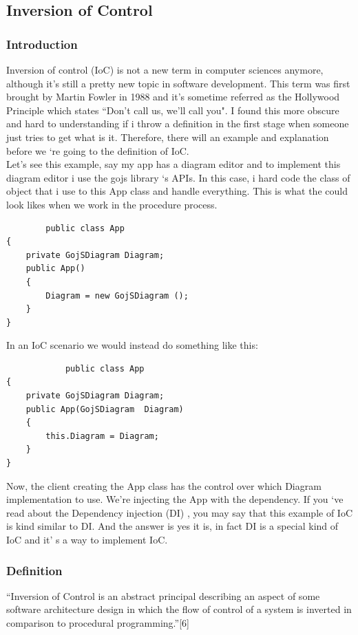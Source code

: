 \documentclass[14pt,a4paper]{extreport}
\begin{document}
		\subsection{Inversion of Control}
			\subsubsection{Introduction}
			Inversion of control (IoC) is not a new term in computer sciences anymore, although it’s still a pretty new topic in software development. This term was first brought by Martin Fowler in 1988\cite{wikiIC} and it’s sometime referred as the Hollywood Principle \cite{wikiIC} which states “Don't call us, we'll call you". I found this more obscure and hard to understanding if i throw a definition in the first stage when someone just tries to get what is it. Therefore, there will an example and explanation before we ‘re going to the definition of IoC.
\\			

Let’s see this example, say my app has a diagram editor and to implement this diagram editor i use the gojs library ‘s APIs. In this case, i hard code the class of object that i use to this App class and handle everything. This is what the could look likes when we work in the procedure process.

		\begin{verbatim}
		public class App
{
    private GojSDiagram Diagram;
    public App()
    {
        Diagram = new GojSDiagram ();
    }
}
		\end{verbatim}
		In an IoC scenario we would instead do something like this:
		\begin{verbatim}
			public class App
{
    private GojSDiagram Diagram;
    public App(GojSDiagram  Diagram)
    {
        this.Diagram = Diagram;
    }
}
		\end{verbatim}
		Now, the client creating the App class has the control over which Diagram implementation to use. We're injecting the App with the dependency. If you ‘ve read about the Dependency injection (DI) , you may say that this example of IoC is kind similar to DI. And the answer is yes it is, in fact DI is a special kind of IoC and it’ s a way to implement IoC.
			\subsubsection{Definition}
“Inversion of Control is an abstract principal describing an aspect of some software architecture design in which the flow of control of a system is inverted in comparison to procedural programming.”[6]
\end{document}
